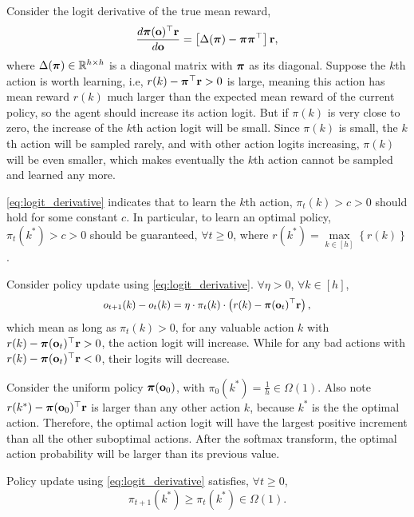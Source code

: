 Consider the logit derivative of the true mean reward,
\begin{equation}
\label{eq:logit_derivative}
\begin{split}
    \frac{d {\boldsymbol{\pi}}( {\mathbf{o}})^\top {\mathbf{r}}}{d {\mathbf{o}}} = \left[ \Delta({\boldsymbol{\pi}}) - {\boldsymbol{\pi}} {\boldsymbol{\pi}}^\top \right] {\mathbf{r}},
\end{split}
\end{equation}
where $\Delta({\boldsymbol{\pi}}) \in {\mathbb{R}}^{h \times h}$ is a diagonal matrix with ${\boldsymbol{\pi}}$ as its diagonal. Suppose the $k$th action is worth learning, i.e, $r(k) - {\boldsymbol{\pi}}^\top {\mathbf{r}} > 0$ is large, meaning this action has mean reward $r(k)$ much larger than the expected mean reward of the current policy, so the agent should increase its action logit. But if $\pi(k)$ is very close to zero, the increase of the $k$th action logit will be small. Since $\pi(k)$ is small, the $k$th action will be sampled rarely, and with other action logits increasing, $\pi(k)$ will be even smaller, which makes eventually the $k$th action cannot be sampled and learned any more.

\cref{eq:logit_derivative} indicates that to learn the $k$th action, $\pi_{t}(k) > c > 0$ should hold for some constant $c$. In particular, to learn an optimal policy, $\pi_{t}(k^*) > c > 0$ should be guaranteed, $\forall t \ge 0$, where $r(k^*) = \max\limits_{k \in \left[ h \right]}\left\{ r(k) \right\}$.

Consider policy update using \cref{eq:logit_derivative}. $\forall \eta > 0$, $\forall k \in [h]$,
\begin{equation*}
\label{eq:logit_increment_logit_space}
\begin{split}
\small
    o_{t+1}(k) - o_{t}(k) = \eta \cdot \pi_{t}(k) \cdot \left( r(k) - \rvpi(\rvo_{t})^\top \rvr \right),
\end{split}
\end{equation*}
which mean as long as $\pi_{t}(k) > 0$, for any valuable action $k$ with $r(k) -  {\boldsymbol{\pi}}({\mathbf{o}}_{t})^\top {\mathbf{r}} > 0$, the action logit will increase. While for any bad actions with $r(k) -  {\boldsymbol{\pi}}({\mathbf{o}}_{t})^\top {\mathbf{r}} < 0$, their logits will decrease.

Consider the uniform policy ${\boldsymbol{\pi}}( {\mathbf{o}}_0)$, with $\pi_{0}(k^*) = \frac{1}{h} \in \Omega(1)$. Also note $r(k^*) - {\boldsymbol{\pi}}( {\mathbf{o}}_0)^\top {\mathbf{r}}$ is larger than any other action $k$, because $k^*$ is the the optimal action. Therefore, the optimal action logit will have the largest positive increment than all the other suboptimal actions. After the softmax transform, the optimal action probability will be larger than its previous value. 
\begin{lem}
\label{lem:optimal_probability_increse_logit_space}
Policy update using \cref{eq:logit_derivative} satisfies, $\forall t \ge 0$,
\begin{equation*}
    \pi_{t+1}(k^*) \ge \pi_{t}(k^*) \in \Omega(1).
\end{equation*}
\end{lem}


